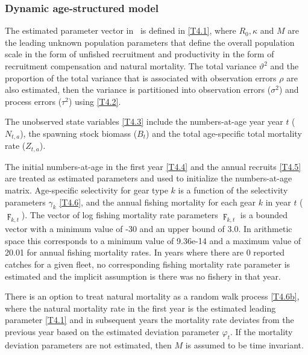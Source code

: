 		
		\subsubsection{Dynamic age-structured model}

The estimated parameter vector in \iscam\ is defined in \eqref{T4.1}, where $R_0, \kappa$ and $M$ are the leading unknown population parameters that define the overall population scale in the form of unfished recruitment and productivity in the form of recruitment compensation and natural mortality.  The total variance $\vartheta^2$ and the proportion of the total variance that is associated with observation errors $\rho$ are also estimated, then the variance is partitioned into observation errors ($\sigma^2$) and process errors ($\tau^2$) using \eqref{T4.2}.

The unobserved state variables \eqref{T4.3} include the numbers-at-age year year $t$ ($N_{t,a}$), the spawning stock biomass ($B_t$) and the total age-specific total mortality rate ($Z_{t,a}$).

The initial numbers-at-age in the first year \eqref{T4.4} and the annual recruits \eqref{T4.5} are treated as estimated parameters and used to initialize the numbers-at-age matrix.  Age-specific selectivity for gear type $k$ is a function of the selectivity parameters $\gamma_k$ \eqref{T4.6}, and the annual fishing mortality for each gear $k$ in year $t$ ($\digamma_{k,t}$).  The vector of log fishing mortality rate parameters $\digamma_{k,t}$ is a bounded vector with a minimum value of -30 and an upper bound of 3.0.  In arithmetic space this corresponds to a minimum value of 9.36e-14 and a maximum value of 20.01 for annual fishing mortality rates.  In years where there are 0 reported catches for a given fleet, no corresponding fishing mortality rate parameter is estimated and the implicit assumption is there was no fishery in that year.

There is an option to treat natural mortality as a random walk process \eqref{T4.6b}, where the natural mortality rate in the first year is the estimated leading parameter \eqref{T4.1} and in subsequent years the mortality rate deviates from the previous year based on the estimated deviation parameter $\varphi_t$.  If the mortality deviation parameters are not estimated, then $M$ is assumed to be time invariant. 



